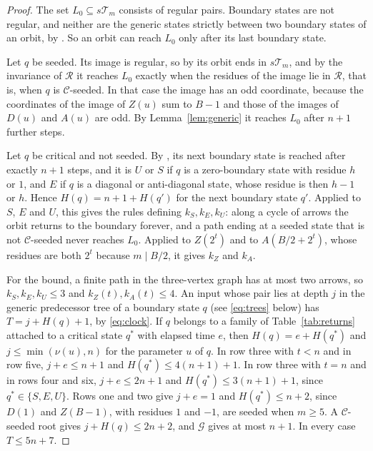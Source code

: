 \documentclass[11pt]{amsart}
\theoremstyle{remark}
\newcommand{\T}{\mathcal{T}}
\newcommand{\C}{\mathcal{C}}
\newcommand{\R}{\mathcal{R}}
\newcommand{\G}{\mathcal{G}}
\newcommand{\vt}{\nu}
\begin{document}
\begin{proof}
The set $L_0\subseteq s\T_m$ consists of regular pairs. Boundary states are not regular, and neither are the generic states strictly between two boundary states of an orbit, by \cite[Lemma~6(a)]{G1}. So an orbit can reach $L_0$ only after its last boundary state.

Let $q$ be seeded. Its image is regular, so by \cite[Lemma~6]{G1} its orbit ends in $s\T_m$, and by the invariance of $\R$ it reaches $L_0$ exactly when the residues of the image lie in $\R$, that is, when $q$ is $\C$-seeded. In that case the image has an odd coordinate, because the coordinates of the image of $Z(u)$ sum to $B-1$ and those of the images of $D(u)$ and $A(u)$ are odd. By Lemma~\ref{lem:generic} it reaches $L_0$ after $n+1$ further steps.

Let $q$ be critical and not seeded. By \cite[Lemma~8]{G1}, its next boundary state is reached after exactly $n+1$ steps, and it is $U$ or $S$ if $q$ is a zero-boundary state with residue $h$ or $1$, and $E$ if $q$ is a diagonal or anti-diagonal state, whose residue is then $h-1$ or $h$. Hence $H(q)=n+1+H(q')$ for the next boundary state $q'$. Applied to $S$, $E$ and $U$, this gives the rules defining $k_S,k_E,k_U$: along a cycle of arrows the orbit returns to the boundary forever, and a path ending at a seeded state that is not $\C$-seeded never reaches $L_0$. Applied to $Z(2^t)$ and to $A(B/2+2^t)$, whose residues are both $2^t$ because $m\mid B/2$, it gives $k_Z$ and $k_A$.

For the bound, a finite path in the three-vertex graph has at most two arrows, so $k_S,k_E,k_U\le3$ and $k_Z(t),k_A(t)\le4$. An input whose pair lies at depth $j$ in the generic predecessor tree of a boundary state $q$ (see \eqref{eq:trees} below) has $T=j+H(q)+1$, by \eqref{eq:clock}. If $q$ belongs to a family of Table~\ref{tab:returns} attached to a critical state $q^*$ with elapsed time $e$, then $H(q)=e+H(q^*)$ and $j\le\min(\vt(u),n)$ for the parameter $u$ of $q$. In row three with $t<n$ and in row five, $j+e\le n+1$ and $H(q^*)\le4(n+1)+1$. In row three with $t=n$ and in rows four and six, $j+e\le2n+1$ and $H(q^*)\le3(n+1)+1$, since $q^*\in\{S,E,U\}$. Rows one and two give $j+e=1$ and $H(q^*)\le n+2$, since $D(1)$ and $Z(B-1)$, with residues $1$ and $-1$, are seeded when $m\ge5$. A $\C$-seeded root gives $j+H(q)\le2n+2$, and $\G$ gives at most $n+1$. In every case $T\le5n+7$.
\end{proof}
\end{document}
